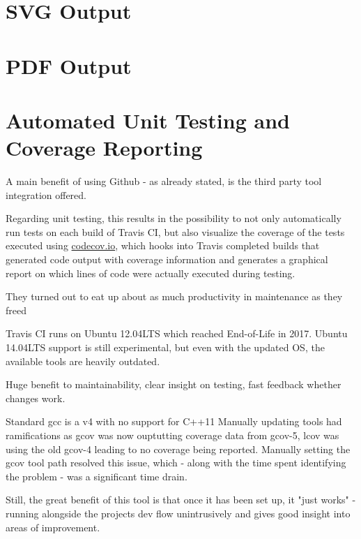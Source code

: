 \section{SVG Output}
\label{sec:svg}

\section{PDF Output}
\label{sec:pdf}


\section{Automated Unit Testing and Coverage Reporting}
A main benefit of using Github - as already stated, is the third party tool integration offered.

Regarding unit testing, this results in the possibility to not only automatically run tests on each build of Travis CI, but also visualize the \gls{coverage} of the tests executed using \url{codecov.io}, which hooks into Travis completed builds that generated code output with coverage information and generates a graphical report on which lines of code were actually executed during testing.

They turned out to eat up about as much productivity in maintenance as they freed

Travis CI runs on Ubuntu 12.04LTS which reached End-of-Life in 2017. Ubuntu 14.04LTS support is still experimental, but even with the updated OS, the available tools are heavily outdated.

Huge benefit to maintainability, clear insight on testing, fast feedback whether changes work.

Standard gcc is a v4 with no support for C++11
Manually updating tools had ramifications as gcov was now ouptutting coverage data from gcov-5, lcov was using the old gcov-4 leading to no coverage being reported. Manually setting the gcov tool path resolved this issue, which - along with the time spent identifying the problem - was a significant time drain.

Still, the great benefit of this tool is that once it has been set up, it "just works" - running alongside the projects dev flow unintrusively and gives good insight into areas of improvement.
